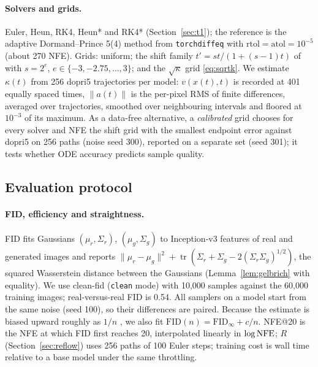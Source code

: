 \paragraph{Solvers and grids.} Euler, Heun, RK4, Heun* and RK4* (Section~\ref{sec:t1}); the reference is the adaptive Dormand--Prince 5(4) method \citep{dormand1980rk} from \texttt{torchdiffeq} \citep{chen2018node} with $\mathrm{rtol}=\mathrm{atol}=10^{-5}$ (about 270 NFE). Grids: uniform; the shift family $t'=st/(1+(s-1)t)$ of \citet{esser2024sd3} with $s=2^e$, $e\in\{-3,-2.75,\dots,3\}$; and the $\sqrt\kappa$ grid \eqref{eq:sqrtk}. We estimate $\kappa(t)$ from 256 dopri5 trajectories per model: $v(x(t),t)$ is recorded at 401 equally spaced times, $\|a(t)\|$ is the per-pixel RMS of finite differences, averaged over trajectories, smoothed over neighbouring intervals and floored at $10^{-3}$ of its maximum. As a data-free alternative, a \emph{calibrated} grid chooses for every solver and NFE the shift grid with the smallest endpoint error against dopri5 on 256 paths (noise seed 300), reported on a separate set (seed 301); it tests whether ODE accuracy predicts sample quality.

\subsection{Evaluation protocol}\label{sec:eval}
\paragraph{FID, efficiency and straightness.} FID \citep{heusel2017fid} fits Gaussians $(\mu_r,\Sigma_r)$, $(\mu_g,\Sigma_g)$ to Inception-v3 features \citep{szegedy2016inception} of real and generated images and reports $\|\mu_r-\mu_g\|^2+\operatorname{tr}(\Sigma_r+\Sigma_g-2(\Sigma_r\Sigma_g)^{1/2})$, the squared Wasserstein distance between the Gaussians (Lemma~\ref{lem:gelbrich} with equality). We use clean-fid \citep{parmar2022cleanfid} (\texttt{clean} mode) with 10,000 samples against the 60,000 training images; real-versus-real FID is 0.54. All samplers on a model start from the same noise (seed 100), so their differences are paired. Because the estimate is biased upward roughly as $1/n$ \citep{chong2020fid}, we also fit $\mathrm{FID}(n)=\mathrm{FID}_\infty+c/n$. NFE@20 is the NFE at which FID first reaches 20, interpolated linearly in $\log\mathrm{NFE}$; $R$ (Section~\ref{sec:reflow}) uses 256 paths of 100 Euler steps; training cost is wall time relative to a base model under the same throttling.
